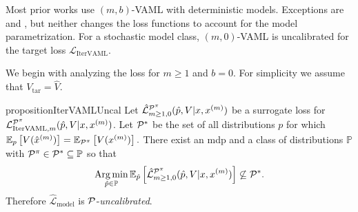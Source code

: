 Most prior works use $(m,b)$-VAML with deterministic models.
Exceptions are \textcite{voelcker2022value} and \textcite{antonoglou2022planning}, but neither changes the loss functions to account for the model parametrization.
For a stochastic model class, $(m,0)$-VAML is uncalibrated for the target loss $\mathcal{L}_\mathrm{IterVAML}$.

We begin with analyzing the loss for $m\geq1$ and $b=0$.
For simplicity we assume that $V_\mathrm{tar} = \hat{V}$.
\begin{restatable}{proposition}{IterVAMLUncal}\label{prop:cvaml:2_1}
    Let $\hat{\mathcal{L}}^{\P^\pi}_{m\geq1,0}(\hat{p},V|x,x^{(m)})$ be a surrogate loss for $\mathcal{L}_{\mathrm{IterVAML}, m}^{\P^\pi}(\hat{p}, V|x, x^{(m)})$.
    Let $\P^*$ be the set of all distributions $p$ for which $\EEX{p}{V(\hat{x}^{(m)})} = \EEX{\P^\pi}{V(x^{(m)})}.$
    There exist an \ac{mdp}   and a class of distributions $\mathbb{P}$ with $\P^\pi \in \P^* \subseteq \mathbb{P}$ so that $$\Argmin_{\hat{p} \in \mathbb{P}} \mathbb{E}_{\hat{p}}\left[\hat{\mathcal{L}}^{\P^\pi}_{m\geq1,0}(\hat{p},V|x,x^{(m)})\right] \not\subseteq \P^*.$$
    Therefore $\hat{\mathcal{L}}_\mathrm{model}$ is $\P$-\emph{uncalibrated}.
\end{restatable}
